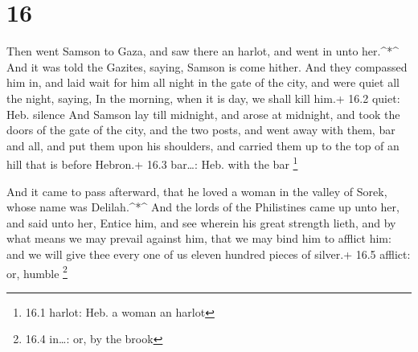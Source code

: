 \hypertarget{section-15}{%
\section{16}\label{section-15}}

 Then went Samson to Gaza, and saw there an harlot, and went
in unto her.\^{}*\^{}  And it was told the Gazites, saying,
Samson is come hither. And they compassed him in, and laid wait for him
all night in the gate of the city, and were quiet all the night, saying,
In the morning, when it is day, we shall kill him.+ 16.2 quiet: Heb.
silence  And Samson lay till midnight, and arose at
midnight, and took the doors of the gate of the city, and the two posts,
and went away with them, bar and all, and put them upon his shoulders,
and carried them up to the top of an hill that is before Hebron.+ 16.3
bar\ldots: Heb. with the bar \footnote{16.1 harlot: Heb. a woman an
  harlot}

 And it came to pass afterward, that he loved a woman in the
valley of Sorek, whose name was Delilah.\^{}*\^{}  And the
lords of the Philistines came up unto her, and said unto her, Entice
him, and see wherein his great strength lieth, and by what means we may
prevail against him, that we may bind him to afflict him: and we will
give thee every one of us eleven hundred pieces of silver.+ 16.5
afflict: or, humble \footnote{16.4 in\ldots: or, by the brook}

